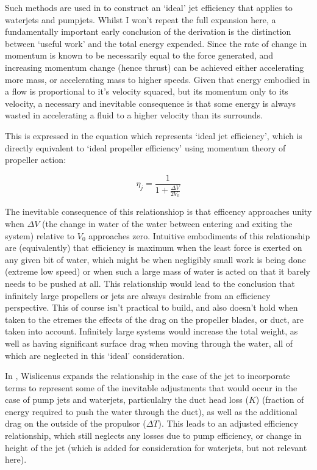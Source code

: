 \documentclass{article}\usepackage[]{graphicx}\usepackage[]{color}
\begin{document}
Such methods are used in \cite[8-14]{wislicenus1973} to construct an `ideal' jet efficiency that applies to waterjets and pumpjets. Whilst I won't repeat the full expansion here, a fundamentally important early conclusion of the derivation is the distinction between `useful work' and the total energy expended. Since the rate of change in momentum is known to be necessarily equal to the force generated, and increasing momentum change (hence thrust) can be achieved either accelerating more mass, or accelerating mass to higher speeds.   Given that energy embodied in a flow is proportional to it's velocity squared, but its momentum only to its velocity, a necessary and inevitable consequence is that some energy is always wasted in accelerating a fluid to a higher velocity than its surrounds.

This is expressed in the equation which represents `ideal jet efficiency', which is directly equivalent to `ideal propeller efficiency' using momentum theory of propeller action:

\begin{equation}
\label{eq:3}
\eta_j = \frac{1}{1+\frac{\Delta V}{2V_0}}
\end{equation}

The inevitable consequence of this relationshiop is that efficency approaches unity when $\Delta V$ (the change in water of the water between entering and exiting the system) relative to $V_0$ approaches zero.  Intuitive embodiments of this relationship are (equivalently) that efficiency is maximum when the least force is exerted on any given bit of water, which might be when negligibly small work is being done (extreme low speed) or when such a large mass of water is acted on that it barely needs to be pushed at all.  This relationship would lead to the conclusion that infinitely large propellers or jets are always desirable from an efficiency perspective.  This of course isn't practical to build, and also doesn't hold when taken to the etremes the effects of the drag on the propeller blades, or duct, are taken into account.  Infinitely large systems would increase the total weight, as well as having significant surface drag when moving through the water, all of which are neglected in this `ideal' consideration.

In \cite[8-14]{wislicenus1973}, Wislicenus expands the relationship in the case of the jet to incorporate terms to represent some of the inevitable adjustments that would occur in the case of pump jets and waterjets, particulalry the duct head loss ($K$) (fraction of energy required to push the water through the duct), as well as the additional drag on the outside of the propulsor ($\Delta T$).  This leads to an adjusted efficiency relationship, which still neglects any losses due to pump efficiency, or change in height of the jet (which is added for consideration for waterjets, but not relevant here).
\end{document}

